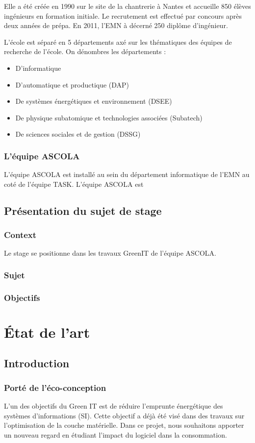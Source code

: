 \documentclass[a4paper, 11pt]{report}
\begin{document}
Elle a été créée en 1990 sur le site de la chantrerie à Nantes et accueille 850 élèves ingénieurs en formation initiale. Le recrutement est effectué par concours après deux années de prépa. En 2011, l’EMN à décerné 250 diplôme d’ingénieur.

L’école est séparé en 5 départements axé sur les thématiques des équipes de recherche de l'école. On dénombres les départements :
\begin{itemize}
	\item D'informatique
	\item D'automatique et productique (DAP)
	\item De systèmes énergétiques et environnement (DSEE)
	\item De physique subatomique et technologies associées (Subatech)
	\item De sciences sociales et de gestion (DSSG)
\end{itemize}

\subsection{L'équipe ASCOLA}
L’équipe ASCOLA est installé au sein du département informatique de l’EMN au coté de l'équipe TASK. L'équipe ASCOLA est 
\section{Présentation du sujet de stage}
\subsection{Context}
Le stage se positionne dans les travaux GreenIT de l’équipe ASCOLA.
\subsection{Sujet}

\subsection{Objectifs}

\chapter{État de l'art}
\section{Introduction}
\subsection{Porté de l'éco-conception}
L’un des objectifs du Green IT est de réduire l’emprunte énergétique des systèmes d’informations (SI). Cette objectif a déjà été visé dans des travaux sur l'optimisation de la couche matérielle. Dans ce projet, nous souhaitons apporter un nouveau regard en étudiant l’impact du logiciel dans la consommation.
\end{document}
